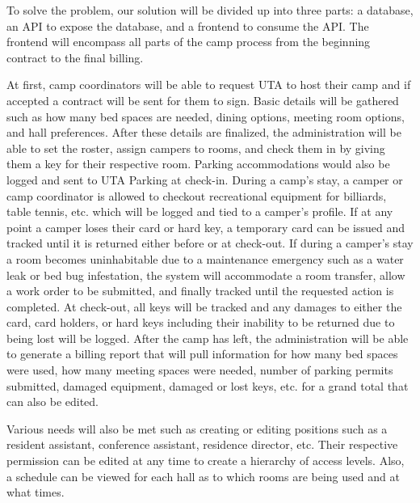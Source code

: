 To solve the problem, our solution will be divided up into three parts: a database, an API to expose the database, and a frontend to consume the API. The frontend will encompass all parts of the camp process from the beginning contract to the final billing. 

At first, camp coordinators will be able to request UTA to host their camp and if accepted a contract will be sent for them to sign. Basic details will be gathered such as how many bed spaces are needed, dining options, meeting room options, and hall preferences. After these details are finalized, the administration will be able to set the roster, assign campers to rooms, and check them in by giving them a key for their respective room. Parking accommodations would also be logged and sent to UTA Parking at check-in. During a camp’s stay, a camper or camp coordinator is allowed to checkout recreational equipment for billiards, table tennis, etc. which will be logged and tied to a camper’s profile. If at any point a camper loses their card or hard key, a temporary card can be issued and tracked until it is returned either before or at check-out. If during a camper’s stay a room becomes uninhabitable due to a maintenance emergency such as a water leak or bed bug infestation, the system will accommodate a room transfer, allow a work order to be submitted, and finally tracked until the requested action is completed. At check-out, all keys will be tracked and any damages to either the card, card holders, or hard keys including their inability to be returned due to being lost will be logged. After the camp has left, the administration will be able to generate a billing report that will pull information for how many bed spaces were used, how many meeting spaces were needed, number of parking permits submitted, damaged equipment, damaged or lost keys, etc. for a grand total that can also be edited. 

	Various needs will also be met such as creating or editing positions such as a resident assistant, conference assistant, residence director, etc. Their respective permission can be edited at any time to create a hierarchy of access levels. Also, a schedule can be viewed for each hall as to which rooms are being used and at what times.
